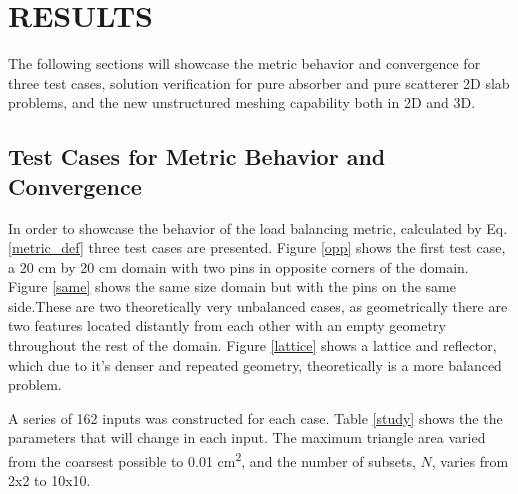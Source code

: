 
\chapter{\uppercase {Results}}
\label{ch:results}

The following sections will showcase the metric behavior and convergence for three test cases, solution verification for pure absorber and pure scatterer 2D slab problems, and the new unstructured meshing capability both in 2D and 3D.

\section{Test Cases for Metric Behavior and Convergence}
\label{sec:convergence}
In order to showcase the behavior of the load balancing metric, calculated by Eq. \ref{metric_def} three test cases are presented. Figure \ref{opp} shows the first test case, a 20 cm by 20 cm domain with two pins in opposite corners of the domain. Figure \ref{same} shows the same size domain but with the pins on the same side.These are two theoretically very unbalanced cases, as geometrically there are two features located distantly from each other with an empty geometry throughout the rest of the domain. Figure \ref{lattice} shows a lattice and reflector, which due to it's denser and repeated geometry, theoretically is a more balanced problem. 

A series of 162 inputs was constructed for each case. Table \ref{study} shows the the parameters that will change in each input. The maximum triangle area varied from the coarsest possible to 0.01 cm\textsuperscript{2}, and the number of subsets, $N$, varies from 2x2 to 10x10. 

